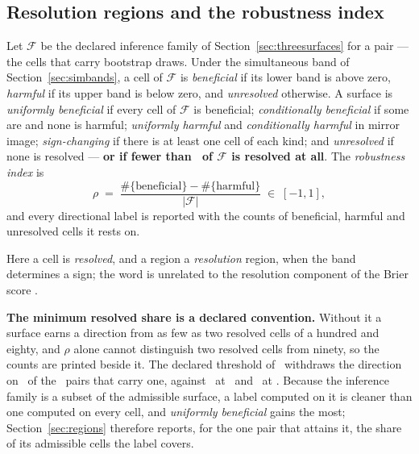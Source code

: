 \subsection{Resolution regions and the robustness index}
\label{sec:regionsdef}

\begin{definition}
\label{def:regions}
Let $\mathcal{F}$ be the declared inference family of
Section~\ref{sec:threesurfaces} for a pair --- the cells that carry bootstrap
draws. Under the simultaneous band of Section~\ref{sec:simbands}, a
cell of
$\mathcal{F}$ is \emph{beneficial} if its lower band is above zero,
\emph{harmful} if its upper band is below zero, and \emph{unresolved}
otherwise. A surface is \emph{uniformly beneficial} if every cell of
$\mathcal{F}$ is beneficial; \emph{conditionally beneficial} if some are and
none is harmful;
\emph{uniformly harmful} and \emph{conditionally harmful} in mirror image;
\emph{sign-changing} if there is at least one cell of each kind; and
\emph{unresolved} if none is resolved --- \textbf{or if fewer than
\minResolvedSharePct\ of $\mathcal{F}$ is resolved at all}. The
\emph{robustness index} is
\[
\rho \;=\; \frac{\#\{\text{beneficial}\} - \#\{\text{harmful}\}}
{|\mathcal{F}|} \;\in\; [-1, 1],
\]
and every directional label is reported with the counts of beneficial,
harmful and unresolved cells it rests on.
\end{definition}

\noindent Here a cell is \emph{resolved}, and a region a \emph{resolution}
region, when the band determines a sign; the word is unrelated to the
resolution component of the Brier score \citep{murphy1973vector}.

\textbf{The minimum resolved share is a declared convention.}
Without it a surface earns a direction from as few as two resolved cells of a
hundred and eighty, and $\rho$ alone cannot distinguish two resolved cells
from ninety, so the counts are printed beside it. The declared threshold of
\minResolvedSharePct\ withdraws the direction on \nLabelsLostToMinShare\ of
the \nDirectionalLabels\ pairs that carry one, against \nLabelsLostMinOne\ at
\minShareLowPct\ and \nLabelsLostMinTen\ at \minShareHighPct. Because the
inference family is a subset of the admissible surface, a label computed on it
is cleaner than one computed on every cell, and \emph{uniformly beneficial}
gains the most; Section~\ref{sec:regions} therefore reports, for the one pair
that attains it, the share of its admissible cells the label covers.

